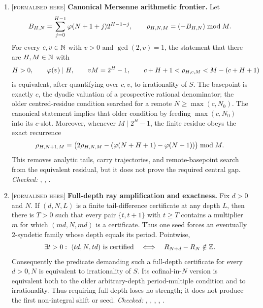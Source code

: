 \documentclass[11pt]{article}
\newcommand{\Stot}{S}
\newcommand{\stag}[1]{{\normalfont\footnotesize\textsc{[#1]}}}
\begin{document}
{\small
\begin{enumerate}[label=\textbf{R\arabic*.},ref=R\arabic*,leftmargin=2.4em,
  itemsep=0.2em,topsep=0.25em]

\item\label{res:canonicalmersenne} \stag{formalised here}
\textbf{Canonical Mersenne arithmetic frontier.}  Let
\[
 B_{H,N}=\sum_{j=0}^{H-1}\varphi(N+1+j)2^{H-1-j},\qquad
 \rho_{H,N,M}=(-B_{H,N})\bmod M.
\]
For every $c,v\in\mathbb{N}$ with $v>0$ and $\gcd(2,v)=1$, the statement that there
are $H,M\in\mathbb{N}$ with
\[
 H>0,\qquad \varphi(v)\mid H,\qquad vM=2^H-1,
 \qquad c+H+1<\rho_{H,c,M}<M-(c+H+1)
\]
is equivalent, after quantifying over $c,v$, to irrationality of $\Stot$.
	The basepoint is exactly $c$, the dyadic valuation of a prospective rational
	denominator; the older centred-residue condition searched for a remote
	$N\ge\max(c,N_0)$.  The canonical statement implies that older condition by
feeding $\max(c,N_0)$ into its $c$-slot.  Moreover, whenever $M\mid2^H-1$,
the finite residue obeys the exact recurrence
\[
 \rho_{H,N+1,M}
 =\bigl(2\rho_{H,N,M}-(\varphi(N+H+1)-\varphi(N+1))\bigr)\bmod M.
\]
This removes analytic tails, carry trajectories, and remote-basepoint search
from the equivalent residual, but it does not prove the required central gap.
{\footnotesize\emph{Checked:}
,
,
.}

\item\label{res:fulldepth} \stag{formalised here}
\textbf{Full-depth ray amplification and exactness.}  Fix $d>0$ and $N$.
If $(d,N,L)$ is a finite tail-difference certificate at any depth $L$, then
there is $T>0$ such that every pair $\{t,t+1\}$ with $t\ge T$ contains a
multiplier $m$ for which $(md,N,md)$ is a certificate.  Thus one seed forces
an eventually $2$-syndetic family whose depth equals its period.  Pointwise,
\[
 \exists t>0:\ (td,N,td)\text{ is certified}
 \quad\Longleftrightarrow\quad R_{N+d}-R_N\notin\mathbb{Z}.
\]
Consequently the predicate demanding such a full-depth certificate for every
$d>0,N$ is equivalent to irrationality of $\Stot$.  Its cofinal-in-$N$
	version is equivalent both to the older arbitrary-depth period-multiple
	condition and to irrationality.  Thus requiring full depth loses no strength;
it does not produce the first non-integral shift or seed.
{\footnotesize\emph{Checked:}
,
,
,
,
.}


\end{enumerate}}
\end{document}
